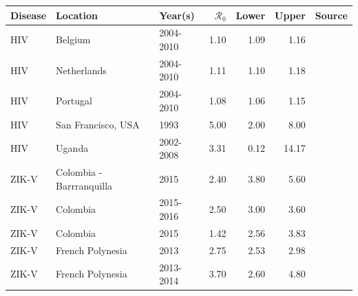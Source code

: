 \documentclass[12pt]{article}
\newcommand{\rr}{\ensuremath{\mathcal{R}_0}}
\begin{document}
\begin{landscape}
\begin{table}
\centering
\begin{tabular}{@{}lllrrrl@{}}
\toprule
\textbf{Disease}    & \textbf{Location}                & \textbf{Year(s)}                 & \textbf{$\rr$} & \textbf{Lower} & \textbf{Upper} & \textbf{Source}                                                                                                                  \\ \midrule
HIV                 & Belgium                          & 2004-2010                     & 1.10          & 1.09           & 1.16           & \cite{coelho2011}   \\
HIV                 & Netherlands                      & 2004-2010                     & 1.11        & 1.10            & 1.18           & \cite{coelho2011}    \\
HIV                 & Portugal                         & 2004-2010                     & 1.08        & 1.06           & 1.15           & \cite{coelho2011}   \\
HIV                 & San Francisco, USA               & 1993                          & 5.00           & 2.00              & 8.00              & \cite{blower1994}    \\
  HIV                 & Uganda                           & 2002-2008                     & 3.31        & 0.12           & 14.17          & \cite{nsubuga2014}    \\ \hline
ZIK-V                & Colombia - Barrranquilla           & 2015                          & 2.40         & 3.80            & 5.60            & \cite{towers2016}    \\  
  ZIK-V                & Colombia                         & 2015-2016                     & 2.50         & 3.00              & 3.60            & \cite{nishiura2016}    \\
ZIK-V                & Colombia                         & 2015                          & 1.42        & 2.56           & 3.83           & \cite{majumder2016}  \\
ZIK-V                & French Polynesia                 & 2013                          & 2.75        & 2.53           & 2.98           & \cite{zhang2017}        \\
ZIK-V                & French Polynesia                 & 2013-2014                     & 3.70         & 2.60            & 4.80            & \cite{kucharski2016}  \\

\end{tabular}
\end{table}
\end{landscape}
\end{document}

